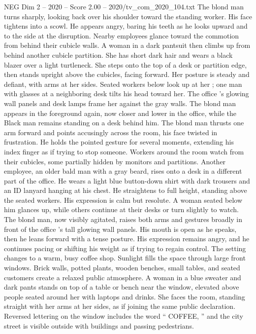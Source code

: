 \begin{textsample}{NEG Dim 2 – 2020 – Score 2.00 – 2020/tv\_com\_2020\_104.txt}
The blond man turns sharply, looking back over his shoulder toward the standing worker.
His face tightens into a scowl.
He appears angry, baring his teeth as he looks upward and to the side at the disruption.
Nearby employees glance toward the commotion from behind their cubicle walls.
A woman in a dark pantsuit then climbs up from behind another cubicle partition.
She has short dark hair and wears a black blazer over a light turtleneck.
She steps onto the top of a desk or partition edge, then stands upright above the cubicles, facing forward.
Her posture is steady and defiant, with arms at her sides.
Seated workers below look up at her ; one man with glasses at a neighboring desk tilts his head toward her.
The office ’s glowing wall panels and desk lamps frame her against the gray walls.
The blond man appears in the foreground again, now closer and lower in the office, while the Black man remains standing on a desk behind him.
The blond man thrusts one arm forward and points accusingly across the room, his face twisted in frustration.
He holds the pointed gesture for several moments, extending his index finger as if trying to stop someone.
Workers around the room watch from their cubicles, some partially hidden by monitors and partitions.
Another employee, an older bald man with a gray beard, rises onto a desk in a different part of the office.
He wears a light blue button-down shirt with dark trousers and an ID lanyard hanging at his chest.
He straightens to full height, standing above the seated workers.
His expression is calm but resolute.
A woman seated below him glances up, while others continue at their desks or turn slightly to watch.
The blond man, now visibly agitated, raises both arms and gestures broadly in front of the office ’s tall glowing wall panels.
His mouth is open as he speaks, then he leans forward with a tense posture.
His expression remains angry, and he continues pacing or shifting his weight as if trying to regain control.
The setting changes to a warm, busy coffee shop.
Sunlight fills the space through large front windows.
Brick walls, potted plants, wooden benches, small tables, and seated customers create a relaxed public atmosphere.
A woman in a blue sweater and dark pants stands on top of a table or bench near the window, elevated above people seated around her with laptops and drinks.
She faces the room, standing straight with her arms at her sides, as if joining the same public declaration.
Reversed lettering on the window includes the word “ COFFEE, ” and the city street is visible outside with buildings and passing pedestrians.

\end{textsample}
